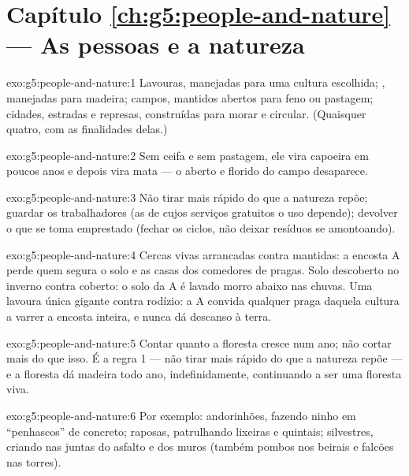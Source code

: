 \section*{Capítulo \ref{ch:g5:people-and-nature} --- As pessoas e a natureza}

\begin{solution}{exo:g5:people-and-nature:1}
Lavouras, manejadas para uma cultura escolhida; , manejadas
para madeira; campos, mantidos abertos para feno ou pastagem;
cidades, estradas e represas, construídas para morar e circular.
(Quaisquer quatro, com as finalidades delas.)
\end{solution}

\begin{solution}{exo:g5:people-and-nature:2}
Sem ceifa e sem pastagem, ele vira capoeira em poucos anos e depois
vira mata --- o  aberto e florido do campo desaparece.
\end{solution}

\begin{solution}{exo:g5:people-and-nature:3}
Não tirar mais rápido do que a natureza repõe; guardar os
trabalhadores (as  de cujos serviços gratuitos o uso
depende); devolver o que se toma emprestado (fechar os ciclos, não
deixar resíduos se amontoando).
\end{solution}

\begin{solution}{exo:g5:people-and-nature:4}
Cercas vivas arrancadas contra mantidas: a encosta A perde quem
segura o solo e as casas dos comedores de pragas. Solo descoberto no
inverno contra coberto: o solo da A é lavado morro abaixo nas chuvas.
Uma lavoura única gigante contra rodízio: a A convida qualquer praga
daquela cultura a varrer a encosta inteira, e nunca dá descanso à
terra.
\end{solution}

\begin{solution}{exo:g5:people-and-nature:5}
Contar quanto a floresta cresce num ano; não cortar mais do que isso.
É a regra 1 --- não tirar mais rápido do que a natureza repõe --- e a
floresta dá madeira todo ano, indefinidamente, continuando a ser uma
floresta viva.
\end{solution}

\begin{solution}{exo:g5:people-and-nature:6}
Por exemplo: andorinhões, fazendo ninho em ``penhascos'' de concreto;
raposas, patrulhando lixeiras e quintais;  silvestres,
criando  nas juntas do asfalto e dos muros (também pombos nos
beirais e falcões nas torres).
\end{solution}

